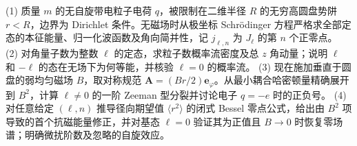 (1) 质量 \(m\) 的无自旋带电粒子电荷 \(q\)，被限制在二维半径 \(R\) 的无穷高圆盘势阱 \(r<R\)，边界为 Dirichlet 条件。无磁场时从极坐标 Schrödinger 方程严格求全部定态的本征能量、归一化波函数及角向简并性，记 \(j_{\ell,n}\) 为 \(J_\ell\) 的第 \(n\) 个正零点。
(2) 对角量子数为整数 \(\ell\) 的定态，求粒子数概率流密度及总 \(z\) 角动量；说明 \(\ell\) 和 \(-\ell\) 的态在无场下为何等能，并核验 \(\ell=0\) 的概率流。
(3) 现在施加垂直于圆盘的弱均匀磁场 \(B\)，取对称规范 \(\mathbf A=(Br/2)\mathbf e_\varphi\)。从最小耦合哈密顿量精确展开到 \(B^2\)，计算 \(\ell\ne0\) 的一阶 Zeeman 型分裂并讨论电子 \(q=-e\) 时的正负号。
(4) 对任意给定 \((\ell,n)\) 推导径向期望值 \(\langle r^2\rangle\) 的闭式 Bessel 零点公式，给出由 \(B^2\) 项导致的首个抗磁能量修正，并对基态 \(\ell=0\) 验证其为正值且 \(B\to0\) 时恢复零场谱；明确微扰阶数及忽略的自旋效应。
